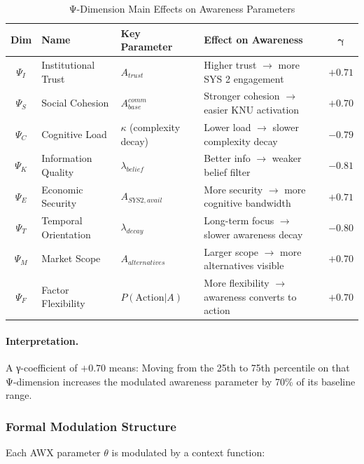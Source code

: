 \begin{table}[htbp]
\centering
\caption{Ψ-Dimension Main Effects on Awareness Parameters}
\label{tab:psi-gamma-main}
\small
\renewcommand{\arraystretch}{1.3}
\begin{tabular}{@{}clllc@{}}
\toprule
\textbf{Dim} & \textbf{Name} & \textbf{Key Parameter} & \textbf{Effect on Awareness} & $\mathbf{\gamma}$ \\
\midrule
$\Psi_I$ & Institutional Trust & $A_{trust}$ & Higher trust $\to$ more SYS 2 engagement & $+0.71$ \\
$\Psi_S$ & Social Cohesion & $A^{comm}_{base}$ & Stronger cohesion $\to$ easier KNU activation & $+0.70$ \\
$\Psi_C$ & Cognitive Load & $\kappa$ (complexity decay) & Lower load $\to$ slower complexity decay & $-0.79$ \\
$\Psi_K$ & Information Quality & $\lambda_{belief}$ & Better info $\to$ weaker belief filter & $-0.81$ \\
$\Psi_E$ & Economic Security & $A_{SYS2,avail}$ & More security $\to$ more cognitive bandwidth & $+0.71$ \\
$\Psi_T$ & Temporal Orientation & $\lambda_{decay}$ & Long-term focus $\to$ slower awareness decay & $-0.80$ \\
$\Psi_M$ & Market Scope & $A_{alternatives}$ & Larger scope $\to$ more alternatives visible & $+0.70$ \\
$\Psi_F$ & Factor Flexibility & $P(\text{Action}|A)$ & More flexibility $\to$ awareness converts to action & $+0.70$ \\
\bottomrule
\end{tabular}
\end{table}

\paragraph{Interpretation.}
A γ-coefficient of $+0.70$ means: Moving from the 25th to 75th percentile on that Ψ-dimension increases the modulated awareness parameter by 70\% of its baseline range.

\subsubsection{Formal Modulation Structure}

Each AWX parameter $\theta$ is modulated by a context function:

